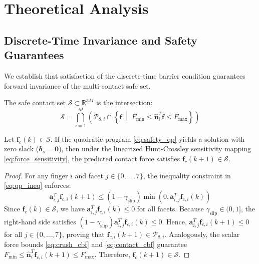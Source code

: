 \section{Theoretical Analysis}
\label{sec:theoretical_analysis}

\subsection{Discrete-Time Invariance and Safety Guarantees}
We establish that satisfaction of the discrete-time barrier condition guarantees forward invariance of the multi-contact safe set.

\begin{definition}
The safe contact set $\mathcal{S} \subset \mathbb{R}^{3M}$ is the intersection:
\begin{equation}
    \mathcal{S} = \bigcap_{i=1}^M \left( \mathcal{P}_{8, i} \cap \left\{ \mathbf{f} \;\middle|\; F_{\min} \le \hat{\mathbf{n}}_i^T \mathbf{f} \le F_{\max} \right\} \right)
\end{equation}
\end{definition}

\begin{theorem}
\label{thm:invariance}
Let $\mathbf{f}_{c}(k) \in \mathcal{S}$. If the quadratic program \eqref{eq:safety_qp} yields a solution with zero slack ($\boldsymbol{\delta}_s = \mathbf{0}$), then under the linearized Hunt-Crossley sensitivity mapping \eqref{eq:force_sensitivity}, the predicted contact force satisfies $\mathbf{f}_c(k+1) \in \mathcal{S}$.
\end{theorem}
\begin{proof}
For any finger $i$ and facet $j \in \{0, \dots, 7\}$, the inequality constraint in \eqref{eq:qp_ineq} enforces:
\begin{equation}
    \mathbf{a}_{i, j}^T \mathbf{f}_{c, i}(k+1) \le (1 - \gamma_{\text{slip}}) \min\left(0, \mathbf{a}_{i, j}^T \mathbf{f}_{c, i}(k)\right)
\end{equation}
Since $\mathbf{f}_c(k) \in \mathcal{S}$, we have $\mathbf{a}_{i, j}^T \mathbf{f}_{c, i}(k) \le 0$ for all facets. Because $\gamma_{\text{slip}} \in (0, 1]$, the right-hand side satisfies $(1 - \gamma_{\text{slip}}) \mathbf{a}_{i, j}^T \mathbf{f}_{c, i}(k) \le 0$. Hence, $\mathbf{a}_{i, j}^T \mathbf{f}_{c, i}(k+1) \le 0$ for all $j \in \{0, \dots, 7\}$, proving that $\mathbf{f}_{c, i}(k+1) \in \mathcal{P}_{8, i}$. Analogously, the scalar force bounds \eqref{eq:crush_cbf} and \eqref{eq:contact_cbf} guarantee $F_{\min} \le \hat{\mathbf{n}}_i^T \mathbf{f}_{c, i}(k+1) \le F_{\max}$. Therefore, $\mathbf{f}_c(k+1) \in \mathcal{S}$.
\end{proof}

